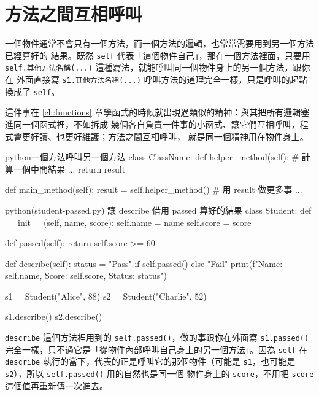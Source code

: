 \section{方法之間互相呼叫}
\label{sec:method-calls-method}

一個物件通常不會只有一個方法，而一個方法的邏輯，也常常需要用到另一個方法已經算好的
結果。既然 \texttt{self} 代表「這個物件自己」，那在一個方法裡面，只要用
\texttt{self.其他方法名稱(...)} 這種寫法，就能呼叫同一個物件身上的另一個方法，跟你在
外面直接寫 \texttt{s1.其他方法名稱(...)} 呼叫方法的道理完全一樣，只是呼叫的起點換成了
\texttt{self}。

這件事在 \ref{ch:functions} 章學函式的時候就出現過類似的精神：與其把所有邏輯塞進同一個函式裡，不如拆成
幾個各自負責一件事的小函式、讓它們互相呼叫，程式會更好讀、也更好維護；方法之間互相呼叫，
就是同一個精神用在物件身上。

\begin{code}{python}{一個方法呼叫另一個方法}
class ClassName:
    def helper_method(self):
        # 計算一個中間結果
        ...
        return result

    def main_method(self):
        result = self.helper_method()
        # 用 result 做更多事
        ...
\end{code}

\begin{example}{python}{(student-passed.py) 讓 describe 借用 passed 算好的結果}
class Student:
    def __init__(self, name, score):
        self.name = name
        self.score = score

    def passed(self):
        return self.score >= 60

    def describe(self):
        status = "Pass" if self.passed() else "Fail"
        print(f"Name: {self.name}, Score: {self.score}, Status: {status}")


s1 = Student("Alice", 88)
s2 = Student("Charlie", 52)

s1.describe()
s2.describe()
\end{example}


\texttt{describe} 這個方法裡用到的 \texttt{self.passed()}，做的事跟你在外面寫
\texttt{s1.passed()} 完全一樣，只不過它是「從物件內部呼叫自己身上的另一個方法」。因為
\texttt{self} 在 \texttt{describe} 執行的當下，代表的正是呼叫它的那個物件（可能是
\texttt{s1}，也可能是 \texttt{s2}），所以 \texttt{self.passed()} 用的自然也是同一個
物件身上的 \texttt{score}，不用把 \texttt{score} 這個值再重新傳一次進去。

